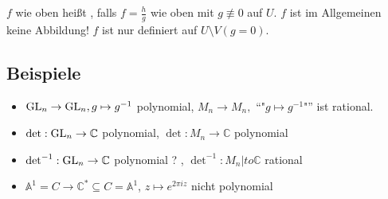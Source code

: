 $f$ wie oben heißt , falls $f= \frac{h}{g}$ wie oben mit $g \not\equiv 0$ auf $U$. $f$ ist im Allgemeinen keine Abbildung! $f$ ist nur definiert auf 
$U \setminus V(g=0)$. 

\subsection{Beispiele} %
\label{sub:13}
\begin{itemize}
	\item $\operatorname{GL}_n \to \operatorname{GL}_n, g \mapsto g ^{-1}$ polynomial, $M_n \to M_n, $ \enquote{"$g \mapsto g ^{-1}$"} ist rational.
	\item $\det : \operatorname{GL}_n \to \mathbb{C}$ polynomial, $\det : M_n \to \mathds{C}$ polynomial
	\item $\det ^{-1} : \operatorname{GL}_n \to \mathbb{C}$ polynomial ? , $\det ^{-1} : M_n |to \mathds{C}$ rational
	\item $\mathds{A}^1 =C \to \mathds{C}^* \subseteq C = \mathds{A}^1$, $z \mapsto e^{2 \pi i z}$ nicht polynomial
\end{itemize}


\cleardoubleoddemptypage
{}
\setcounter{page}{1}
\printindex
\listoffigures
\todototoc
{}

